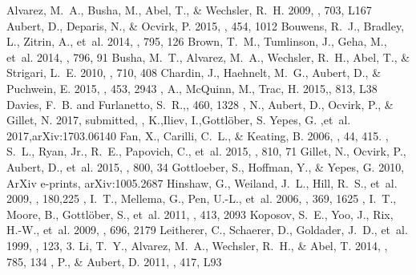 \documentclass[twocolumn]{aastex61}
\begin{document}
\begin{thebibliography}{}

 Alvarez, M.~A., Busha, M., Abel, T., \& Wechsler, R.~H. 2009, \apjl,
  703, L167
 Aubert, D., Deparis, N., \& Ocvirk, P. 2015, \mnras, 454, 1012
 {Bouwens}, R.~J., {Bradley}, L., {Zitrin}, A., {et~al.} 2014, \apj, 795, 126
 {Brown}, T.~M., {Tumlinson}, J., {Geha}, M., {et~al.} 2014, \apj, 796, 91
 {Busha}, M.~T., {Alvarez}, M.~A., {Wechsler}, R.~H., {Abel}, T., \& {Strigari}, L.~E. 2010, \apj, 710, 408
 {Chardin}, J., {Haehnelt}, M.~G., {Aubert}, D., \& {Puchwein}, E. 2015, \mnras, 453, 2943
, A., {McQuinn}, M., {Trac}, H. 2015,\apjl, 813, L38
 {Davies}, F.~B. and {Furlanetto}, S.~R.,\mnras, 460, 1328
, N., {Aubert}, D., {Ocvirk}, P., \& {Gillet}, N. 2017, submitted,
, K.,{Iliev}, I.,{Gottl{\"o}ber}, S.
	{Yepes}, G. ,{et~al.} 2017,arXiv:1703.06140
 Fan, X., Carilli, C.~L., \& Keating, B. 2006, \araa, 44, 415.
, S.~L., {Ryan}, Jr., R.~E., {Papovich}, C., {et~al.} 2015, \apj, 810, 71
 {Gillet}, N., {Ocvirk}, P., {Aubert}, D., {et~al.} 2015, \apj, 800, 34
 {Gottloeber}, S., {Hoffman}, Y., \& {Yepes}, G. 2010, ArXiv e-prints, arXiv:1005.2687
 {Hinshaw}, G., {Weiland}, J.~L., {Hill}, R.~S., {et~al.} 2009, \apjs, 180,225
, I.~T., {Mellema}, G., {Pen}, U.-L., {et~al.} 2006, \mnras, 369, 1625
, I.~T., {Moore}, B., {Gottl{\"o}ber}, S., {et~al.} 2011, \mnras, 413,
  2093
 {Koposov}, S.~E., {Yoo}, J., {Rix}, H.-W., {et~al.} 2009, \apj, 696, 2179
 Leitherer, C., Schaerer, D., Goldader, J.~D., {et~al.} 1999, \apjs, 123, 3.
 {Li}, T.~Y., {Alvarez}, M.~A., {Wechsler}, R.~H., \& {Abel}, T. 2014, \apj, 785, 134
, P., \& {Aubert}, D. 2011, \mnras, 417, L93

\end{thebibliography}
\end{document}

